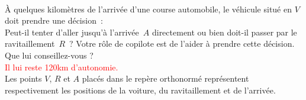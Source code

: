 \documentclass[a4paper,12pt,twocolumn,landscape]{article}
\begin{document}
\begin{minipage}{0.45\textwidth}
\begin{center}
\begin{tikzpicture}[scale=1,every node/.style={scale=1}]
	\end{tikzpicture}
	\\[2em]
	\end{center}
	À quelques kilomètres de l'arrivée d'une course automobile, le véhicule situé en $V$ doit prendre une décision~:\\	
	Peut-il tenter d'aller jusqu'à l'arrivée~$A$ directement ou bien doit-il passer par le ravitaillement~$R$~? Votre rôle de copilote est de l'aider à prendre cette décision.\\ Que lui conseillez-vous ?\\ \textcolor{red}{Il lui reste 120km d'autonomie.}\\
Les points $V$, $R$ et $A$ placés dans le repère orthonormé représentent respectivement les positions de la voiture, du ravitaillement et de l'arrivée.
\vspace{-2em}	

\end{minipage}
\end{document}
